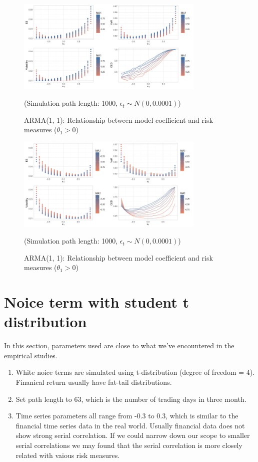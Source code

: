 \documentclass[11pt]{article}
\begin{document}
\begin{figure}[H]
\centering
\includegraphics[width = 0.8\textwidth]{../figures/simulation/AR1MA1_risk_measures_pos_coef}
\caption{ARMA(1, 1): Relationship between model coefficient and risk measures ($\theta_1>0$)}
(Simulation path length: 1000, $\epsilon_t \sim N(0, 0.0001)$)
\label{fig:AR1MA1_risk_measures_pos_coef}
\end{figure}

\begin{figure}[H]
\centering
\includegraphics[width = 0.8\textwidth]{../figures/simulation/AR1MA1_risk_measures_neg_coef}
\caption{ARMA(1, 1): Relationship between model coefficient and risk measures ($\theta_1>0$)}
(Simulation path length: 1000, $\epsilon_t \sim N(0, 0.0001)$)
\label{fig:AR1MA1_risk_measures_neg_coef}
\end{figure}




\section{Noice term with student t distribution}

In this section, parameters used are close to what we've encountered in the empirical studies. 
\begin{enumerate}
\item White noice terms are simulated using t-distribution (degree of freedom = 4). Finanical return usually have fat-tail distributions.
\item Set path length to 63, which is the number of trading days in three month.
\item Time series parameters all range from -0.3 to 0.3, which is similar to the financial time series data in the real world. Usually financial data does not show strong serial correlation. If we could narrow down our scope to smaller serial correlations we may found that the serial correlation is more closely related with vaious risk measures.
\end{enumerate}
\end{document}
